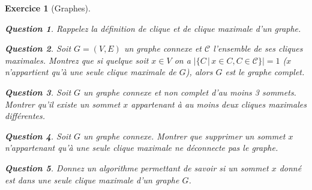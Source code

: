 \documentclass{article}
\theoremstyle{exostyle}
\newtheorem{exo}{Exercice}
\theoremstyle{partiestyle}
\theoremstyle{questionstyle}
\newtheorem{question}{Question}[exo]
\begin{document}
\begin{exo}[Graphes]
	\begin{question}
		Rappelez la définition de clique et de clique maximale d'un graphe.
	\end{question}
	\begin{question}
		Soit $G = (V, E)$ un graphe connexe et $\mathcal{C}$ l'ensemble de ses cliques maximales. Montrez que si quelque soit $x \in V$ on a $|\{ C \,\vert\, x \in C, C \in \mathcal{C}\}| = 1$ ($x$ n'appartient qu'à une seule clique maximale de $G$), alors $G$ est le graphe complet.
	\end{question}
	\begin{question}
		Soit $G$ un graphe connexe et non complet d'au moins 3 sommets. Montrer qu'il existe un sommet $x$ appartenant à au moins deux cliques maximales différentes.
	\end{question}
	\begin{question}
		Soit $G$ un graphe connexe. Montrer que supprimer un sommet $x$ n'appartenant qu'à une seule clique maximale ne déconnecte pas le graphe.
	\end{question}
	\begin{question}
Donnez un algorithme permettant de savoir si un sommet $x$ donné est dans une seule clique maximale d'un graphe $G$.
	\end{question}

\end{exo}
\end{document}
